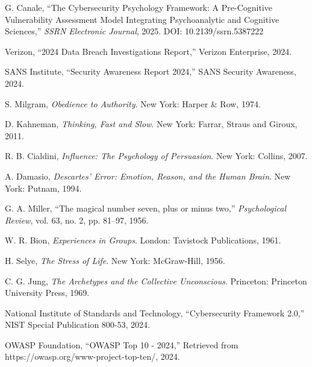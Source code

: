 \documentclass[10pt,twocolumn]{IEEEtran}
\begin{document}
\begin{thebibliography}{99}

G. Canale, ``The Cybersecurity Psychology Framework: A Pre-Cognitive Vulnerability Assessment Model Integrating Psychoanalytic and Cognitive Sciences,'' \emph{SSRN Electronic Journal}, 2025. DOI: 10.2139/ssrn.5387222

Verizon, ``2024 Data Breach Investigations Report,'' Verizon Enterprise, 2024.

SANS Institute, ``Security Awareness Report 2024,'' SANS Security Awareness, 2024.

S. Milgram, \emph{Obedience to Authority}. New York: Harper \& Row, 1974.

D. Kahneman, \emph{Thinking, Fast and Slow}. New York: Farrar, Straus and Giroux, 2011.

R. B. Cialdini, \emph{Influence: The Psychology of Persuasion}. New York: Collins, 2007.

A. Damasio, \emph{Descartes' Error: Emotion, Reason, and the Human Brain}. New York: Putnam, 1994.

G. A. Miller, ``The magical number seven, plus or minus two,'' \emph{Psychological Review}, vol. 63, no. 2, pp. 81--97, 1956.

W. R. Bion, \emph{Experiences in Groups}. London: Tavistock Publications, 1961.

H. Selye, \emph{The Stress of Life}. New York: McGraw-Hill, 1956.

C. G. Jung, \emph{The Archetypes and the Collective Unconscious}. Princeton: Princeton University Press, 1969.

National Institute of Standards and Technology, ``Cybersecurity Framework 2.0,'' NIST Special Publication 800-53, 2024.

OWASP Foundation, ``OWASP Top 10 - 2024,'' Retrieved from https://owasp.org/www-project-top-ten/, 2024.

\end{thebibliography}
\end{document}
